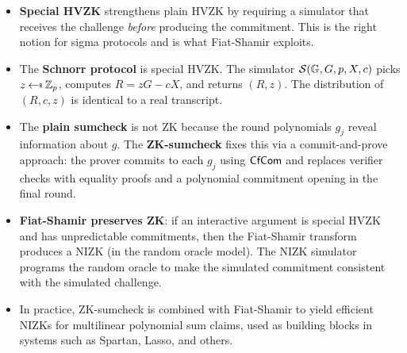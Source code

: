 \documentclass[11pt]{article}
\begin{document}
\begin{itemize}
  \item \textbf{Special HVZK} strengthens plain HVZK by requiring a
        simulator that receives the challenge \emph{before} producing
        the commitment.  This is the right notion for sigma protocols
        and is what Fiat-Shamir exploits.

  \item The \textbf{Schnorr protocol} is special HVZK.  The simulator
        $\mathcal{S}(\mathbb{G}, G, p, X, c)$ picks $z \getsr \mathbb{Z}_p$,
        computes $R = zG - cX$, and returns $(R, z)$.  The distribution
        of $(R, c, z)$ is identical to a real transcript.

  \item The \textbf{plain sumcheck} is not ZK because the round
        polynomials $g_j$ reveal information about $g$.  The
        \textbf{ZK-sumcheck} fixes this via a commit-and-prove
        approach: the prover commits to each $g_j$ using $\mathsf{CfCom}$
        and replaces verifier checks with equality proofs and a
        polynomial commitment opening in the final round.

  \item \textbf{Fiat-Shamir preserves ZK}: if an interactive argument
        is special HVZK and has unpredictable commitments, then the
        Fiat-Shamir transform produces a NIZK (in the random oracle
        model).  The NIZK simulator programs the random oracle to make
        the simulated commitment consistent with the simulated challenge.

  \item In practice, ZK-sumcheck is combined with Fiat-Shamir to
        yield efficient NIZKs for multilinear polynomial sum claims,
        used as building blocks in systems such as Spartan, Lasso,
        and others.
\end{itemize}
\end{document}
